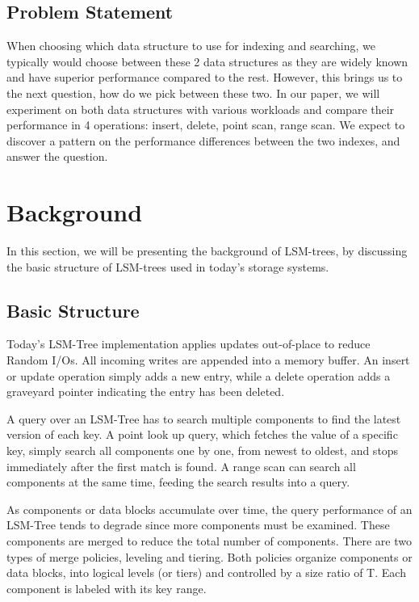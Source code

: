 \documentclass[sigconf]{acmart}
\begin{document}
    \subsection{Problem Statement}

    When choosing which data structure to use for indexing and searching, we typically would choose between these 2 data structures as they are widely known and have superior performance compared to the rest. However, this brings us to the next question, how do we pick between these two. In our paper, we will experiment on both data structures with various workloads and compare their performance in 4 operations: insert, delete, point scan, range scan. We expect to discover a pattern on the performance differences between the two indexes, and answer the question.


    \section{Background}

    In this section, we will be presenting the background of LSM-trees, by discussing the basic structure of LSM-trees used in today's storage systems.

    \subsection{Basic Structure}
    Today's LSM-Tree implementation applies updates out-of-place to reduce Random I/Os. All incoming writes are appended into a memory buffer. An insert or update operation simply adds a new entry, while a delete operation adds a graveyard pointer indicating the entry has been deleted.

    A query over an LSM-Tree has to search multiple components to find the latest version of each key. A point look up query, which fetches the value of a specific key, simply search all components one by one, from newest to oldest, and stops immediately after the first match is found. A range scan can search all components at the same time, feeding the search results into a query.

    As components or data blocks accumulate over time, the query performance of an LSM-Tree tends to degrade since more components must be examined. These components are merged to reduce the total number of components. There are two types of merge policies, leveling and tiering. Both policies organize components or data blocks, into logical levels (or tiers) and controlled by a size ratio of T. Each component is labeled with its key range.
\end{document}
